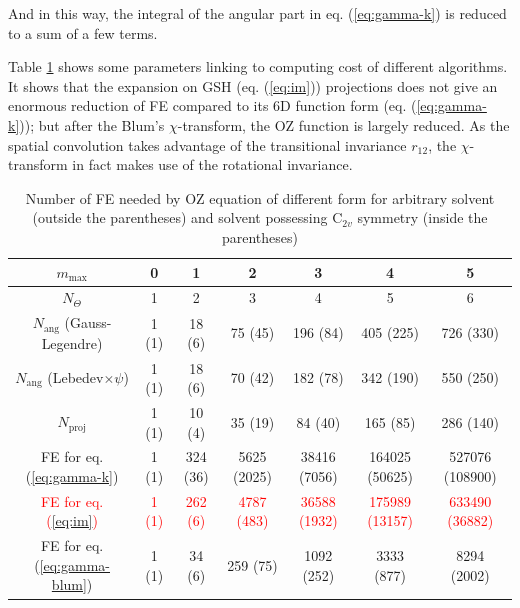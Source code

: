 And in this way, the integral of the angular part in eq. (\ref{eq:gamma-k})
is reduced to a sum of a few terms.

Table \ref{tab:FE-of-OZ} shows some parameters linking to computing
cost of different algorithms. It shows that the expansion on GSH (eq.
(\ref{eq:im})) projections does not give an enormous reduction of
FE compared to its 6D function form (eq. (\ref{eq:gamma-k})); but
after the Blum's $\chi$-transform, the OZ function is largely reduced.
As the spatial convolution takes advantage of the transitional invariance
$r_{12}$, the $\chi$-transform in fact makes use of the rotational
invariance.

\begin{table}[h]
\begin{centering}
\begin{tabular*}{1\textwidth}{@{\extracolsep{\fill}}ccccccc}
\toprule 
{\footnotesize{}$m_{\mathrm{max}}$} & {\footnotesize{}0} & {\footnotesize{}1} & {\footnotesize{}2} & {\footnotesize{}3} & {\footnotesize{}4} & {\footnotesize{}5}\tabularnewline
\midrule
{\footnotesize{}$N_{\Theta}$} & {\footnotesize{}1} & {\footnotesize{}2} & {\footnotesize{}3} & {\footnotesize{}4} & {\footnotesize{}5} & {\footnotesize{}6}\tabularnewline
{\footnotesize{}$N_{\mathrm{ang}}$ (Gauss-Legendre)} & {\footnotesize{}1 (1)} & {\footnotesize{}18 (6)} & {\footnotesize{}75 (45)} & {\footnotesize{}196 (84)} & {\footnotesize{}405 (225)} & {\footnotesize{}726 (330)}\tabularnewline
{\footnotesize{}$N_{\mathrm{ang}}$ (Lebedev$\times\psi$)} & {\footnotesize{}1 (1)} & {\footnotesize{}18 (6)} & {\footnotesize{}70 (42)} & {\footnotesize{}182 (78)} & {\footnotesize{}342 (190)} & {\footnotesize{}550 (250)}\tabularnewline
{\footnotesize{}$N_{\mathrm{proj}}$ } & {\footnotesize{}1 (1)} & {\footnotesize{}10 (4)} & {\footnotesize{}35 (19)} & {\footnotesize{}84 (40)} & {\footnotesize{}165 (85)} & {\footnotesize{}286 (140)}\tabularnewline
{\footnotesize{}FE for eq. (\ref{eq:gamma-k})} & {\footnotesize{}1 (1)} & {\footnotesize{}324 (36)} & {\footnotesize{}5625 (2025)} & {\footnotesize{}38416 (7056)} & {\footnotesize{}164025 (50625)} & {\footnotesize{}527076 (108900)}\tabularnewline
\textcolor{red}{\footnotesize{}FE for eq. (\ref{eq:im})} & \textcolor{red}{\footnotesize{}1 (1)} & \textcolor{red}{\footnotesize{}262 (6)} & \textcolor{red}{\footnotesize{}4787 (483)} & \textcolor{red}{\footnotesize{}36588 (1932)} & \textcolor{red}{\footnotesize{}175989 (13157)} & \textcolor{red}{\footnotesize{}633490 (36882)}\tabularnewline
{\footnotesize{}FE for eq. (\ref{eq:gamma-blum})} & {\footnotesize{}1 (1)} & {\footnotesize{}34 (6)} & {\footnotesize{}259 (75)} & {\footnotesize{}1092 (252)} & {\footnotesize{}3333 (877)} & {\footnotesize{}8294 (2002)}\tabularnewline
\bottomrule
\end{tabular*}
\par\end{centering}

\caption [Number of FE needed by OZ equation of different form]{Number of FE needed by OZ equation of different form for arbitrary
solvent (outside the parentheses) and solvent possessing $\mathrm{C}_{2v}$
symmetry (inside the parentheses)\label{tab:FE-of-OZ}}
\end{table}



